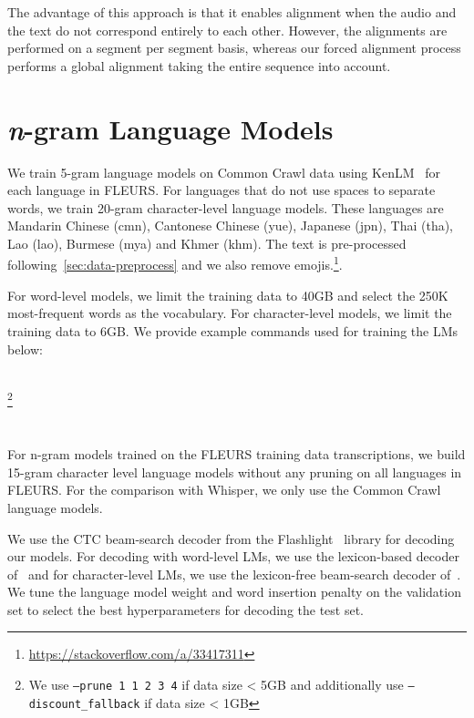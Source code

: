 The advantage of this approach is that it enables alignment when the audio and the text do not correspond entirely to each other. 
However, the alignments are performed on a segment per segment basis, whereas our forced alignment process performs a global alignment taking the entire sequence into account. 



\section{\textit{n}-gram Language Models} 
\label{app:train-lms}

We train 5-gram language models on Common Crawl data using KenLM~\citep{heafield-2011-kenlm} for each language in FLEURS.
For languages that do not use spaces to separate words, we train 20-gram character-level language models.
These languages are Mandarin Chinese (cmn), Cantonese Chinese (yue), Japanese (jpn), Thai (tha), Lao (lao), Burmese (mya) and Khmer (khm).
The text is pre-processed following~\autoref{sec:data-preprocess} and we also remove emojis.\footnote{\url{https://stackoverflow.com/a/33417311}}.

For word-level models, we limit the training data to 40GB and select the 250K most-frequent words as the vocabulary. 
For character-level models, we limit the training data to 6GB.
We provide example commands used for training the LMs below:

\\
\footnote{We use \texttt{--prune 1 1 2 3 4} if data size < 5GB and additionally use \texttt{--discount\_fallback} if data size < 1GB }  \\

 \\
 \\

For n-gram models trained on the FLEURS training data transcriptions, we build 15-gram character level language models without any pruning on all languages in FLEURS. 
For the comparison with Whisper, we only use the Common Crawl language models. 

We use the CTC beam-search decoder from the Flashlight~\citep{kahn2022flashlight} library for decoding our models. 
For decoding with word-level LMs, we use the lexicon-based decoder of~\citet{collobert2016wav2letter, pratap2019w2l} and for character-level LMs, we use the lexicon-free beam-search decoder of~\citet{likhomanenko2019convlm}. 
We tune the language model weight and word insertion penalty on the validation set to select the best hyperparameters for decoding the test set.



